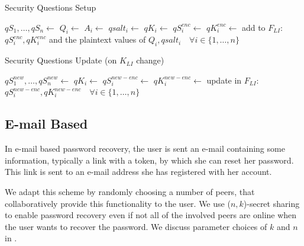 \begin{algorithm}
\caption{Security Questions Setup}
\begin{algorithmic}[\LineNumFrequency]
\State $qS_1,\dots,qS_n \gets$  
  \State $Q_i \gets$ 
  \State $A_i \gets$ 
  \State $qsalt_i \gets$ \NewSalt
  \State $qK_i \gets$ 
  \State $qS_i^{enc} \gets$ 
  \State $qK_i^{enc} \gets$ 
\EndFor
\State add to $F_{LI}$: $qS_i^{enc},qK_i^{enc}$ and the plaintext values of $Q_i,qsalt_i \quad\forall i \in \{1,\dots,n\}$ 
\end{algorithmic}
\end{algorithm}

\begin{algorithm}
\caption{Security Questions Update (on $K_{LI}$ change)}
\begin{algorithmic}[\LineNumFrequency]
\State $qS_1^{new},\dots,qS_n^{new} \gets$ 
  \State $qK_i \gets$ 
  \State $qS_i^{new-enc} \gets$ 
  \State $qK_i^{new-enc} \gets$ 
\EndFor
\State update in $F_{LI}$: $qS_i^{new-enc},qK_i^{new-enc} \quad\forall i \in \{1,\dots,n\}$ 
\end{algorithmic}
\end{algorithm}

\subsection{E-mail Based}

In e-mail based password recovery, the user is sent an e-mail
containing some information, typically a link with a token, by which she can
reset her password. This link is sent to an e-mail address she has registered
with her account.

We adapt this scheme by randomly choosing a number of peers, that collaboratively provide this
functionality to the user. We use ($n,k$)-secret sharing 
to enable password recovery even if not all of the involved peers are online
when the user wants to recover the password. We discuss parameter choices of $k$ and $n$
in .

